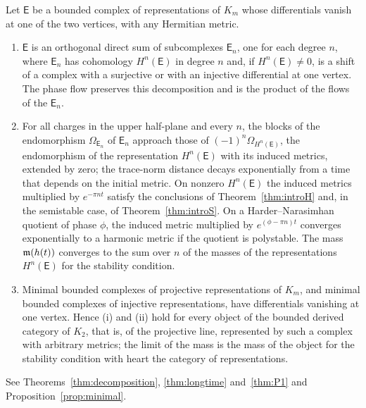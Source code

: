 \begin{theorem}\label{thm:introD}
Let $\mathsf E$ be a bounded complex of representations of $K_m$ whose
differentials vanish at one of the two vertices, with any Hermitian metric.
\begin{enumerate}
\item[(i)] $\mathsf E$ is an orthogonal direct sum of subcomplexes
 $\mathsf E_n$, one for each degree $n$, where $\mathsf E_n$ has cohomology
 $H^n(\mathsf E)$ in degree $n$ and, if $H^n(\mathsf E)\neq0$, is a shift of a
 complex with a surjective or with an injective differential at one vertex.
 The phase flow preserves this decomposition and is the product of the flows
 of the $\mathsf E_n$.
\item[(ii)] For all charges in the upper half-plane and every $n$, the
 blocks of the endomorphism $\Omega_{\mathsf E_n}$ of $\mathsf E_n$ approach
 those of $(-1)^n\Omega_{H^n(\mathsf E)}$, the endomorphism of the
 representation $H^n(\mathsf E)$ with its induced metrics, extended by zero;
 the trace-norm distance decays exponentially from a time that depends on
 the initial metric. On nonzero $H^n(\mathsf E)$ the induced metrics
 multiplied by $e^{-\pi nt}$ satisfy the conclusions of
 Theorem~\ref{thm:introH} and, in the semistable case, of
 Theorem~\ref{thm:introS}. On a Harder--Narasimhan quotient of phase
 $\phi$, the induced metric multiplied by $e^{(\phi-\pi n)t}$ converges
 exponentially to a harmonic metric if the quotient is polystable. The mass
 $\mathfrak m(h(t))$ converges to the sum over $n$ of the masses of the
 representations $H^n(\mathsf E)$ for the stability condition.
\item[(iii)] Minimal bounded complexes of projective representations of
 $K_m$, and minimal bounded complexes of injective representations, have
 differentials vanishing at one vertex. Hence (i) and (ii) hold for every
 object of the bounded derived category of $K_2$, that is, of the projective
 line, represented by such a complex with arbitrary metrics; the limit of
 the mass is the mass of the object for the stability condition with heart
 the category of representations.
\end{enumerate}
\end{theorem}

See Theorems~\ref{thm:decomposition}, \ref{thm:longtime} and~\ref{thm:P1}
and Proposition~\ref{prop:minimal}.

